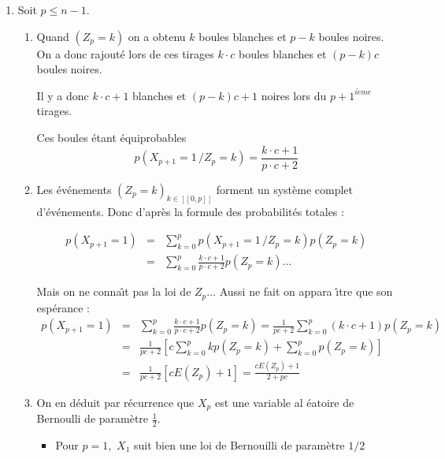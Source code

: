 \documentclass[a4paper, 11pt,reqno]{article}
\begin{document}
\begin{correction}
\begin{enumerate}
\item Soit $p\leqslant n-1$.

\begin{enumerate}
\item Quand $\left( Z_{p}=k\right) $ on a obtenu $k$ boules blanches et $p-k 
$ boules noires. On a donc rajout\'{e} lors de ces tirages $k\cdot c$ boules
blanches et $\left( p-k\right) c$ boules noires.

Il y a donc $k\cdot c+1$ blanches et $\left( p-k\right) c+1$ noires lors du $%
p+1^{i\grave{e}me}$ tirages$.$

Ces boules \'{e}tant \'{e}quiprobables 
\begin{equation*}
p(X_{p+1}=1\,/Z_{p}=k)=\frac{k\cdot c+1}{p\cdot c+2}
\end{equation*}

\item Les \'{e}v\'{e}nements $\left( Z_{p}=k\right) _{k\in \left[ \left[ 0,p%
\right] \right] }$ forment un syst\`{e}me complet d'\'{e}v\'{e}nements. Donc
d'apr\`{e}s la formule des probabilit\'{e}s totales :

\begin{eqnarray*}
p\left( X_{p+1}=1\right) &=&\sum_{k=0}^{p}p(X_{p+1}=1\,/Z_{p}=k)p\left(
Z_{p}=k\right) \\
&=&\sum_{k=0}^{p}\frac{k\cdot c+1}{p\cdot c+2}p\left( Z_{p}=k\right) \dots
\end{eqnarray*}

Mais on ne conna\^{\i}t pas la loi de $Z_{p}\dots $ Aussi ne fait on appara%
\^{\i}tre que son esp\'{e}rance : 
\begin{eqnarray*}
p\left( X_{p+1}=1\right) &=&\sum_{k=0}^{p}\frac{k\cdot c+1}{p\cdot c+2}%
p\left( Z_{p}=k\right) =\frac{1}{pc+2}\sum_{k=0}^{p}\left( k\cdot c+1\right)
p\left( Z_{p}=k\right) \\
&=&\frac{1}{pc+2}\left[ c\sum_{k=0}^{p}kp\left( Z_{p}=k\right)
+\sum_{k=0}^{p}p\left( Z_{p}=k\right) \right] \\
&=&\frac{1}{pc+2}\left[ cE\left( Z_{p}\right) +1\right] =\frac{cE\left(
Z_{p}\right) +1}{2+pc}
\end{eqnarray*}

\item On en d\'{e}duit par r\'{e}currence que $X_{p}$ est une variable al%
\'{e}atoire de Bernoulli de param\`{e}tre $\displaystyle \frac{1}{2}$.

\begin{itemize}
\item Pour $p=1,$ $X_{1}$ suit bien une loi de Bernouilli de param\`{e}tre $%
1/2$


\end{itemize}
\end{enumerate}
\end{enumerate}
\end{correction}
\end{document}

